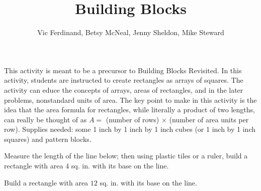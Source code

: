 \documentclass{ximera}
\title{Building Blocks}
\author{Vic Ferdinand, Betsy McNeal, Jenny Sheldon, Mike Steward}
\begin{document}
\begin{abstract}
\end{abstract}

\maketitle

\begin{instructorIntro}
This activity is meant to be a precursor to Building Blocks Revisited.  In this activity, students are instructed to create rectangles as arrays of squares.  The activity can educe the concepts of arrays, areas of rectangles, and in the later problems, nonstandard units of area.  The key point to make in this activity is the idea that the area formula for rectangles, while literally a product of two lengths, can really be thought of as $A = $ (number of rows) $\times$ (number of area units per row).
\vskip 0.1in
Supplies needed: some 1 inch by 1 inch by 1 inch cubes (or 1 inch by 1 inch squares) and pattern blocks.




\end{instructorIntro}



\begin{problem} 
Measure the length of the line below; then using plastic tiles or a ruler, build a rectangle with area $4$ sq. in. with its base on the line.

\vspace{1 in}


\end{problem}

\begin{problem}
Build a rectangle with area $12$ sq. in. with its base on the line.

\vspace{3.25 in}


\end{problem}
\end{document}
